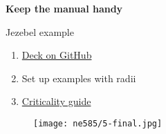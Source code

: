 \documentclass[aspectratio=1610,pdftex,dvipsnames,compress,xcolor={dvipsnames}]{beamer}
\newcommand{\acs}{\acrshort} %
\begin{document}
\begin{frame}[plain]{}
    \centering\LARGE\textbf{Keep the manual handy}
\end{frame}


\addtocounter{framenumber}{-1} 
\begin{frame}{Jezebel example}
    \begin{enumerate}[series=techniques,topsep=0pt,itemsep=21pt,leftmargin=*,label=(\arabic*)]
        \item[]\href{https://github.com/TheDoctorRAB/mcnpx.decks/blob/master/criticality/jezebel.inp}{Deck on GitHub}
        \item[]Set up examples with radii
        \item[]\href{https://www.osti.gov/servlets/purl/10171566}{Criticality guide}
    \end{enumerate}
\end{frame}


\begin{frame}[plain]{}
    \begin{figure}
        \centering
        \texttt{[image: ne585/5-final.jpg]}
    \end{figure}
\end{frame}


%
%
%



%    
%    
\end{document}
